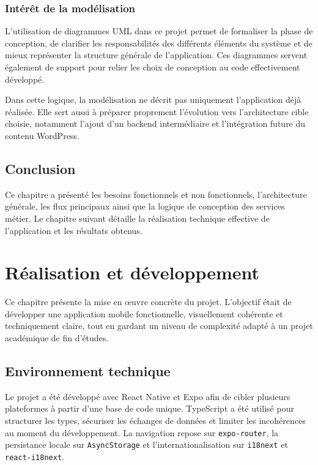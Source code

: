 \documentclass[12pt,a4paper]{report}
\begin{document}
\subsection{Intérêt de la modélisation}

L'utilisation de diagrammes UML dans ce projet permet de formaliser la phase de conception, de clarifier les responsabilités des différents éléments du système et de mieux représenter la structure générale de l'application. Ces diagrammes servent également de support pour relier les choix de conception au code effectivement développé.

Dans cette logique, la modélisation ne décrit pas uniquement l'application déjà réalisée. Elle sert aussi à préparer proprement l'évolution vers l'architecture cible choisie, notamment l'ajout d'un backend intermédiaire et l'intégration future du contenu WordPress.

\section*{Conclusion}

Ce chapitre a présenté les besoins fonctionnels et non fonctionnels, l'architecture générale, les flux principaux ainsi que la logique de conception des services métier. Le chapitre suivant détaille la réalisation technique effective de l'application et les résultats obtenus.

\chapter{Réalisation et développement}

Ce chapitre présente la mise en œuvre concrète du projet. L'objectif était de développer une application mobile fonctionnelle, visuellement cohérente et techniquement claire, tout en gardant un niveau de complexité adapté à un projet académique de fin d'études.

\section{Environnement technique}

Le projet a été développé avec React Native et Expo afin de cibler plusieurs plateformes à partir d'une base de code unique. TypeScript a été utilisé pour structurer les types, sécuriser les échanges de données et limiter les incohérences au moment du développement. La navigation repose sur \texttt{expo-router}, la persistance locale sur \texttt{AsyncStorage} et l'internationalisation sur \texttt{i18next} et \texttt{react-i18next}.
\end{document}
